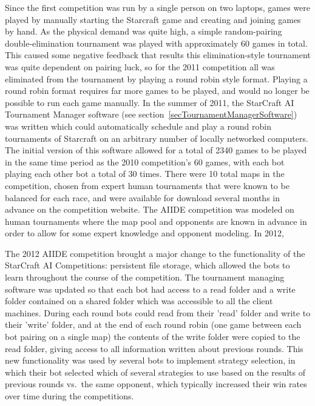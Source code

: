 Since the first competition was run by a single person on two laptops, games were played by manually starting the Starcraft game and creating and joining games by hand. As the physical demand was quite high, a simple random-pairing double-elimination tournament was played with approximately 60 games in total. This caused some negative feedback that results this elimination-style tournament was quite dependent on pairing luck, so for the 2011 competition all was eliminated from the tournament by playing a round robin style format. Playing a round robin format requires far more games to be played, and would no longer be possible to run each game manually. In the summer of 2011, the StarCraft AI Tournament Manager software (see section~\ref{secTournamentManagerSoftware}) was written which could automatically schedule and play a round robin tournaments of Starcraft on an arbitrary number of locally networked computers. The initial version of this software allowed for a total of 2340 games to be played in the same time period as the 2010 competition's 60 games, with each bot playing each other bot a total of 30 times. There were 10 total maps in the competition, chosen from expert human tournaments that were known to be balanced for each race, and were available for download several months in advance on the competition website. The AIIDE competition was modeled on human tournaments where the map pool and opponents are known in advance in order to allow for some expert knowledge and opponent modeling. In 2012, 


The 2012 AIIDE competition brought a major change to the functionality of the StarCraft AI Competitions: persistent file storage, which allowed the bots to learn throughout the course of the competition. The tournament managing software was updated so that each bot had access to a read folder and a write folder contained on a shared folder which was accessible to all the client machines. During each round bots could read from their 'read' folder and write to their 'write' folder, and at the end of each round robin (one game between each bot pairing on a single map) the contents of the write folder were copied to the read folder, giving access to all information written about previous rounds. This new functionality was used by several bots to implement strategy selection, in which their bot selected which of several strategies to use based on the results of previous rounds vs.\ the same opponent, which typically increased their win rates over time during the competitions.

